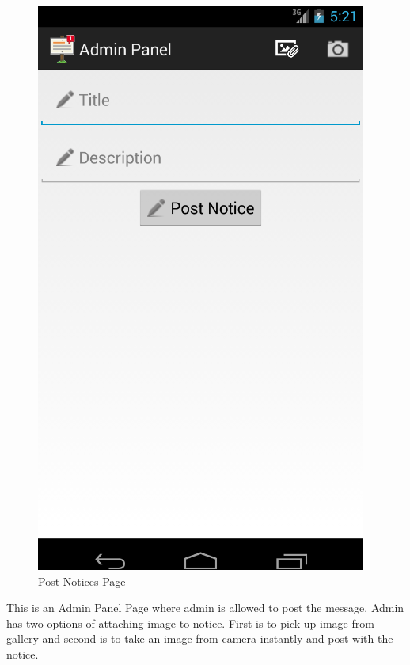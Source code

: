 \begin{figure}[H]
\centering \includegraphics[scale=0.7]{image/post.png}
\caption{Post Notices Page}
\end{figure}
This is an Admin Panel Page where admin is allowed to post the message. Admin has two options of attaching image to notice.
First is to pick up image from gallery and second is to take an image from camera instantly and post with the notice.

